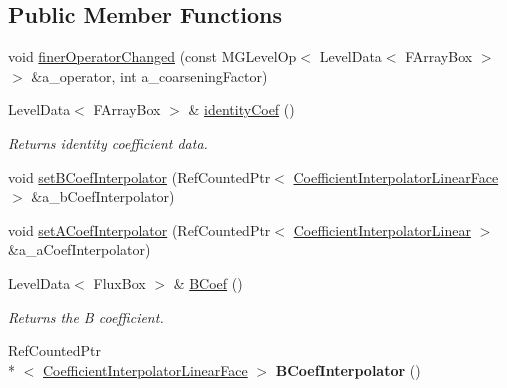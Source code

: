 \subsection*{Public Member Functions}
\begin{DoxyCompactItemize}
\item 
void \hyperlink{class_a_m_r_liquid_conc_op_adfb6b6edc76c0a591576dc6637942b38}{finer\-Operator\-Changed} (const M\-G\-Level\-Op$<$ Level\-Data$<$ F\-Array\-Box $>$ $>$ \&a\-\_\-operator, int a\-\_\-coarsening\-Factor)
\item 
\hypertarget{class_a_m_r_liquid_conc_op_ab6e8dc3971f2c2e3c43a34f56db38ee5}{Level\-Data$<$ F\-Array\-Box $>$ \& \hyperlink{class_a_m_r_liquid_conc_op_ab6e8dc3971f2c2e3c43a34f56db38ee5}{identity\-Coef} ()}\label{class_a_m_r_liquid_conc_op_ab6e8dc3971f2c2e3c43a34f56db38ee5}

\begin{DoxyCompactList}\small\item\em Returns identity coefficient data. \end{DoxyCompactList}\item 
void \hyperlink{class_a_m_r_liquid_conc_op_a4730e7a12afd0dfe91c051b25404c463}{set\-B\-Coef\-Interpolator} (Ref\-Counted\-Ptr$<$ \hyperlink{class_coefficient_interpolator_linear_face}{Coefficient\-Interpolator\-Linear\-Face} $>$ \&a\-\_\-b\-Coef\-Interpolator)
\item 
void \hyperlink{class_a_m_r_liquid_conc_op_acd81dfef975e54c697cb1ddbc40ab4a2}{set\-A\-Coef\-Interpolator} (Ref\-Counted\-Ptr$<$ \hyperlink{class_coefficient_interpolator_linear}{Coefficient\-Interpolator\-Linear} $>$ \&a\-\_\-a\-Coef\-Interpolator)
\item 
\hypertarget{class_a_m_r_liquid_conc_op_a6f927dba115fa04d0573d4a06e226c5f}{Level\-Data$<$ Flux\-Box $>$ \& \hyperlink{class_a_m_r_liquid_conc_op_a6f927dba115fa04d0573d4a06e226c5f}{B\-Coef} ()}\label{class_a_m_r_liquid_conc_op_a6f927dba115fa04d0573d4a06e226c5f}

\begin{DoxyCompactList}\small\item\em Returns the B coefficient. \end{DoxyCompactList}\item 
\hypertarget{class_a_m_r_liquid_conc_op_ae5c6e1076ca9ba04c206aff3fc7e24df}{Ref\-Counted\-Ptr\\*
$<$ \hyperlink{class_coefficient_interpolator_linear_face}{Coefficient\-Interpolator\-Linear\-Face} $>$ {\bfseries B\-Coef\-Interpolator} ()}\label{class_a_m_r_liquid_conc_op_ae5c6e1076ca9ba04c206aff3fc7e24df}


\end{DoxyCompactItemize}
